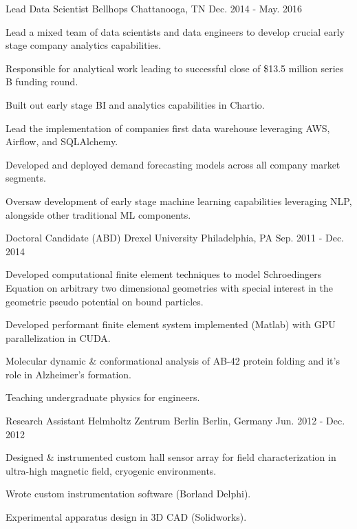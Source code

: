 \begin{cventries}
  \cventry
    {Lead Data Scientist} %
    {Bellhops} %
    {Chattanooga, TN} %
    {Dec. 2014 - May. 2016} %
    {
      \begin{cvitems} %
        \item {Lead a mixed team of data scientists and data engineers to develop crucial early stage company analytics capabilities.}
        \item {Responsible for analytical work leading to successful close of \$13.5 million series B funding round.}
        \item {Built out early stage BI and analytics capabilities in Chartio.}
        \item {Lead the implementation of companies first data warehouse leveraging AWS, Airflow, and SQLAlchemy.}
        \item {Developed and deployed demand forecasting models across all company market segments.}
        \item {Oversaw development of early stage machine learning capabilities leveraging NLP, alongside other traditional ML components.}
      \end{cvitems}
    }

  \cventry
    {Doctoral Candidate (ABD)} %
    {Drexel University} %
    {Philadelphia, PA} %
    {Sep. 2011 - Dec. 2014} %
    {
      \begin{cvitems} %
        \item {Developed computational finite element techniques to model Schroedingers Equation on arbitrary two dimensional geometries with special interest in the geometric pseudo potential on bound particles.}
        \item {Developed performant finite element system implemented (Matlab) with GPU parallelization in CUDA.}
        \item {Molecular dynamic \& conformational analysis of AB-42 protein folding and it's role in Alzheimer's formation.}
        \item {Teaching undergraduate physics for engineers.}
      \end{cvitems}
    }

  \cventry
    {Research Assistant} %
    {Helmholtz Zentrum Berlin} %
    {Berlin, Germany} %
    {Jun. 2012 - Dec. 2012} %
    {
      \begin{cvitems} %
        \item {Designed \& instrumented custom hall sensor array for field characterization in ultra-high magnetic field, cryogenic environments.}
        \item {Wrote custom instrumentation software (Borland Delphi).}
        \item {Experimental apparatus design in 3D CAD (Solidworks).}
      \end{cvitems}
    }

\end{cventries}
